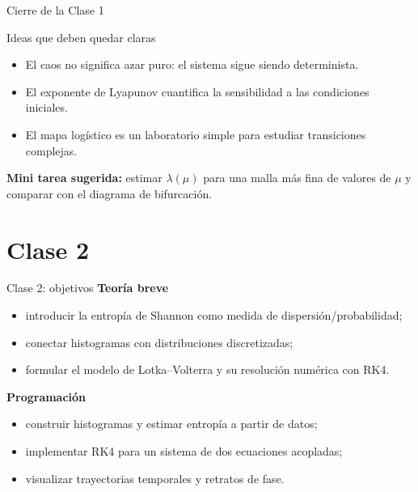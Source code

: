 \begin{frame}{Cierre de la Clase 1}
\begin{block}{Ideas que deben quedar claras}
\begin{itemize}
    \item El caos no significa azar puro: el sistema sigue siendo determinista.
    \item El exponente de Lyapunov cuantifica la sensibilidad a las condiciones iniciales.
    \item El mapa logístico es un laboratorio simple para estudiar transiciones complejas.
\end{itemize}
\end{block}

\textbf{Mini tarea sugerida:} estimar $\lambda(\mu)$ para una malla más fina de valores de $\mu$ y comparar con el diagrama de bifurcación.
\end{frame}

\section{Clase 2}

\begin{frame}{Clase 2: objetivos}
\textbf{Teoría breve}
\begin{itemize}
    \item introducir la entropía de Shannon como medida de dispersión/probabilidad;
    \item conectar histogramas con distribuciones discretizadas;
    \item formular el modelo de Lotka--Volterra y su resolución numérica con RK4.
\end{itemize}

\vspace{0.2cm}
\textbf{Programación}
\begin{itemize}
    \item construir histogramas y estimar entropía a partir de datos;
    \item implementar RK4 para un sistema de dos ecuaciones acopladas;
    \item visualizar trayectorias temporales y retratos de fase.
\end{itemize}
\end{frame}

